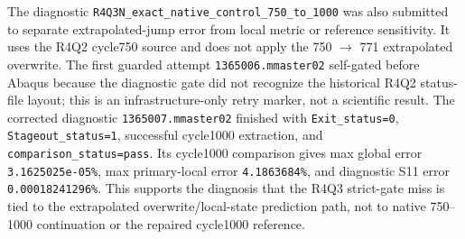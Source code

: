 \documentclass[11pt,a4paper]{article}
\newcommand{\code}[1]{\texttt{#1}}
\begin{document}
The diagnostic \code{R4Q3N\_exact\_native\_control\_750\_to\_1000} was also submitted to separate extrapolated-jump error from local metric or reference sensitivity. It uses the R4Q2 cycle750 source and does not apply the 750 \(\rightarrow\) 771 extrapolated overwrite. The first guarded attempt \code{1365006.mmaster02} self-gated before Abaqus because the diagnostic gate did not recognize the historical R4Q2 status-file layout; this is an infrastructure-only retry marker, not a scientific result. The corrected diagnostic \code{1365007.mmaster02} finished with \code{Exit\_status=0}, \code{Stageout\_status=1}, successful cycle1000 extraction, and \code{comparison\_status=pass}. Its cycle1000 comparison gives max global error \code{3.1625025e-05\%}, max primary-local error \code{4.1863684\%}, and diagnostic S11 error \code{0.00018241296\%}. This supports the diagnosis that the R4Q3 strict-gate miss is tied to the extrapolated overwrite/local-state prediction path, not to native 750--1000 continuation or the repaired cycle1000 reference.
\end{document}

